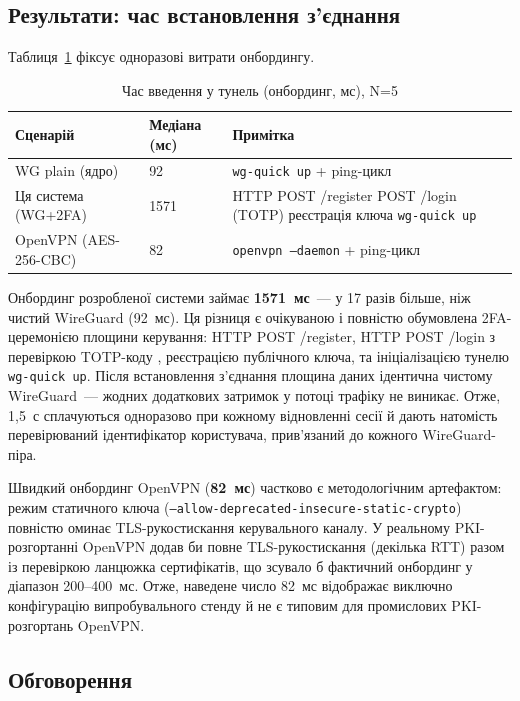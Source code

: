 \subsection{Результати: час встановлення з'єднання}
\label{subsec:perf_results_onboard}

Таблиця~\ref{tab:perf_onboard} фіксує одноразові витрати онбордингу.

\begin{table}[htbp]\centering
\caption{Час введення у тунель (онбординг, мс), N=5}
\label{tab:perf_onboard}
\begin{tabularx}{\textwidth}{|l|X|X|}\hline
\textbf{Сценарій} & \textbf{Медіана (мс)} & \textbf{Примітка} \\\hline
WG plain (ядро)       & 92    & \texttt{wg-quick up} + ping-цикл \\\hline
Ця система (WG+2FA)   & 1571  & HTTP POST /register \textrightarrow{} POST /login (TOTP) \textrightarrow{} реєстрація ключа \textrightarrow{} \texttt{wg-quick up} \\\hline
OpenVPN (AES-256-CBC) & 82    & \texttt{openvpn --daemon} + ping-цикл \\\hline
\end{tabularx}\end{table}

Онбординг розробленої системи займає \textbf{1571~мс}~--- у 17 разів більше,
ніж чистий WireGuard (92~мс). Ця різниця є очікуваною і повністю обумовлена
2FA-церемонією площини керування: HTTP POST /register, HTTP POST /login з
перевіркою TOTP-коду \cite{rfc6238}, реєстрацією публічного ключа, та
ініціалізацією тунелю \texttt{wg-quick up}. Після встановлення з'єднання
площина даних ідентична чистому WireGuard~--- жодних додаткових затримок у
потоці трафіку не виникає. Отже, 1{,}5~с сплачуються одноразово при
кожному відновленні сесії й дають натомість перевірюваний ідентифікатор
користувача, прив'язаний до кожного WireGuard-піра.

Швидкий онбординг OpenVPN (\textbf{82~мс}) частково є методологічним
артефактом: режим статичного ключа
(\texttt{--allow-deprecated-insecure-static-crypto}) повністю оминає
TLS-рукостискання керувального каналу. У реальному PKI-розгортанні
OpenVPN додав би повне TLS-рукостискання (декілька RTT) разом із
перевіркою ланцюжка сертифікатів, що зсувало б фактичний онбординг у
діапазон 200--400~мс. Отже, наведене число 82~мс відображає виключно
конфігурацію випробувального стенду й не є типовим для промислових
PKI-розгортань OpenVPN.

\subsection{Обговорення}
\label{subsec:perf_discussion}

